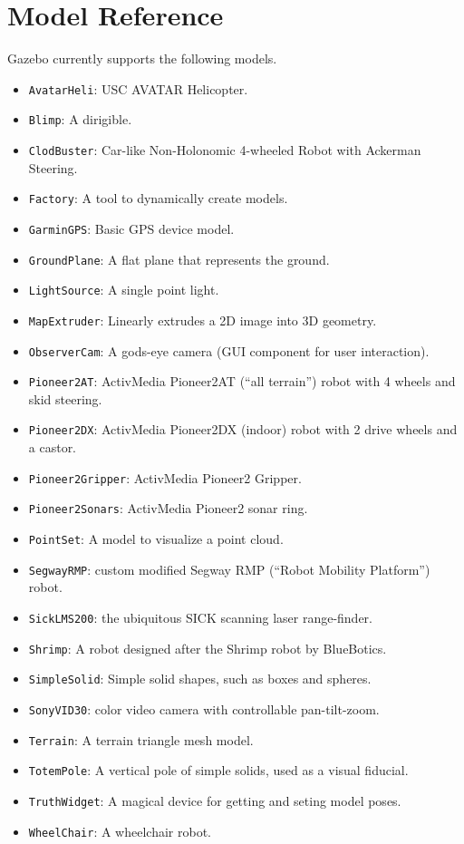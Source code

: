 \documentclass[11pt]{report}
\begin{document}

\chapter{Model Reference}
\label{sec.model.ref}

Gazebo currently supports the following models.
\begin{itemize}
\item {\tt AvatarHeli}: USC AVATAR Helicopter.
\item {\tt Blimp}: A dirigible.
\item {\tt ClodBuster}: Car-like Non-Holonomic 4-wheeled Robot with Ackerman Steering.
\item {\tt Factory}: A tool to dynamically create models.
\item {\tt GarminGPS}: Basic GPS device model. 
\item {\tt GroundPlane}: A flat plane that represents the ground.
\item {\tt LightSource}: A single point light.
\item {\tt MapExtruder}: Linearly extrudes a 2D image into 3D geometry.
\item {\tt ObserverCam}: A gods-eye camera (GUI component for user interaction).
\item {\tt Pioneer2AT}: ActivMedia Pioneer2AT (``all terrain'')
robot with 4 wheels and skid steering.
\item {\tt Pioneer2DX}: ActivMedia Pioneer2DX (indoor)
robot with 2 drive wheels and a castor.
\item {\tt Pioneer2Gripper}: ActivMedia Pioneer2 Gripper.
\item {\tt Pioneer2Sonars}: ActivMedia Pioneer2 sonar ring.
\item {\tt PointSet}: A model to visualize a point cloud.
\item {\tt SegwayRMP}: custom modified Segway RMP (``Robot Mobility
Platform'') robot.
\item {\tt SickLMS200}: the ubiquitous SICK scanning laser
range-finder.
\item {\tt Shrimp}: A robot designed after the Shrimp robot by BlueBotics.
\item {\tt SimpleSolid}: Simple solid shapes, such as boxes and spheres.
\item {\tt SonyVID30}: color video camera with controllable
pan-tilt-zoom.
\item {\tt Terrain}: A terrain triangle mesh model.
\item {\tt TotemPole}: A vertical pole of simple solids, used as a visual fiducial.
\item {\tt TruthWidget}: A magical device for getting and seting model poses.
\item {\tt WheelChair}: A wheelchair robot.
\end{itemize}
\end{document}

